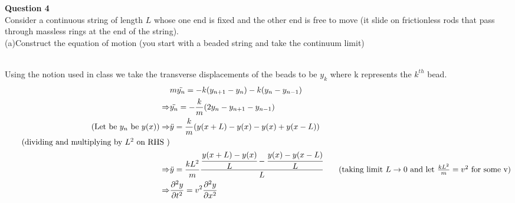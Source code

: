 \documentclass[addpoints]{exam}
\begin{document}
\begin{questions}
\question \textbf{ Question 4}\\
Consider a continuous string of length  $L$ whose one end is fixed and the other end is free to
move (it slide on frictionless rods that pass through massless rings at the end of the string).\\ 
(a)Construct the equation of motion (you start with a beaded string and take the continuum
limit)
\begin{solution}\\
   Using the notion used in class we take the transverse displacements of the beads to be $y_k$
   where k represents the $k^{th}$ bead.
   \begin{align*}
       &m\ddot{y_n} = -k(y_{n+1}-y_n)-k(y_n-y_{n-1})\\ 
       \Rightarrow&\ddot{y_n} = -\frac{k}{m}(2y_n-y_{n+1}-y_{n-1})\\  
       \tag{Let be $y_n$ be $y(x)$}
       \Rightarrow&\ddot{y} = \frac{k}{m}(y(x+L)-y(x) - y(x) + y(x-L))\\ 
       \tag{dividing and multiplying by $L^2$ on RHS }\\ 
       \Rightarrow&\ddot{y} = \frac{kL^2}{m} \cfrac{\cfrac{y(x+L)-y(x)}{L}-\cfrac{y(x)-y(x-L)}{L}}{L}
        \tag{taking limit $L\rightarrow0$ and let $\frac{kL^2}{m}= v^2$ for some v}\\ 
       \Rightarrow&\pdv[2]{y}{t} = v^2 \pdv[2]{y}{x}
   \end{align*}
\end{solution}


\end{questions}
\end{document}

